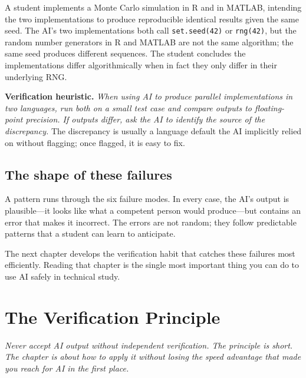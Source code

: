 \documentclass[11pt]{book}
\begin{document}
\begin{example}
A student implements a Monte Carlo simulation in R and in MATLAB, intending the two implementations to produce reproducible identical results given the same seed. The AI's two implementations both call \texttt{set.seed(42)} or \texttt{rng(42)}, but the random number generators in R and MATLAB are not the same algorithm; the same seed produces different sequences. The student concludes the implementations differ algorithmically when in fact they only differ in their underlying RNG.
\end{example}

\textbf{Verification heuristic.} \emph{When using AI to produce parallel implementations in two languages, run both on a small test case and compare outputs to floating-point precision. If outputs differ, ask the AI to identify the source of the discrepancy.} The discrepancy is usually a language default the AI implicitly relied on without flagging; once flagged, it is easy to fix.

\section{The shape of these failures}

A pattern runs through the six failure modes. In every case, the AI's output is plausible---it looks like what a competent person would produce---but contains an error that makes it incorrect. The errors are not random; they follow predictable patterns that a student can learn to anticipate.

The next chapter develops the verification habit that catches these failures most efficiently. Reading that chapter is the single most important thing you can do to use AI safely in technical study.

\chapter{The Verification Principle}
\label{ch:verification}

\noindent \emph{Never accept AI output without independent verification. The principle is short. The chapter is about how to apply it without losing the speed advantage that made you reach for AI in the first place.}
\end{document}
